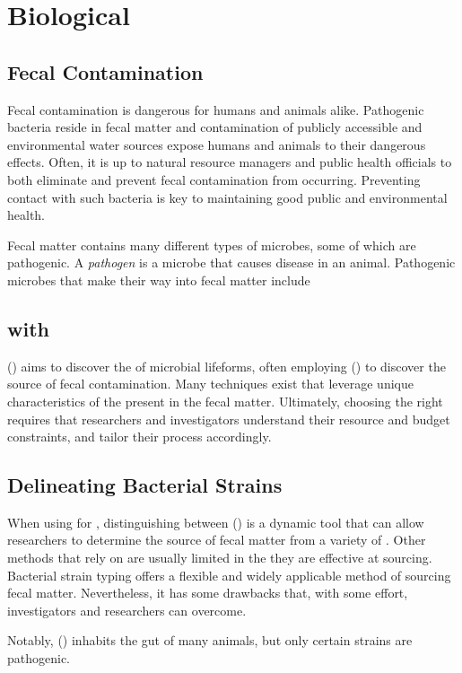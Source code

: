 \section{Biological}
\subsection{Fecal Contamination}
Fecal contamination is dangerous for humans and animals alike.
Pathogenic bacteria reside in fecal matter and contamination of publicly accessible and environmental water sources expose humans and animals to their dangerous effects.
Often, it is up to natural resource managers and public health officials to both eliminate and prevent fecal contamination from occurring.
Preventing contact with such bacteria is key to maintaining good public and environmental health.

Fecal matter contains many different types of microbes, some of which are pathogenic.
A \textit{pathogen} is a microbe that causes disease in an animal.
Pathogenic microbes that make their way into fecal matter include



\subsection{\MSTlong{} with \FIBlong{}}
\MSTlong{} (\mst{}) aims to discover the \spec{} of microbial lifeforms, often employing \FIBlong{} (\fib{}) to discover the source of fecal contamination.
Many techniques exist that leverage unique characteristics of the \fib{} present in the fecal matter.
Ultimately, choosing the right \fib{} requires that researchers and investigators understand their resource and budget constraints, and tailor their \mst{} process accordingly.

\subsection{Delineating Bacterial Strains}
When using \fib{} for \mst{}, distinguishing between \bslongs{} (\bs{}) is a dynamic tool that can allow researchers to determine the source of fecal matter from a variety of \spec{}.
Other methods that rely on \mst{} are usually limited in the \spec{} they are effective at sourcing.
Bacterial strain typing offers a flexible and widely applicable method of sourcing fecal matter.
Nevertheless, it has some drawbacks that, with some effort, \mst{} investigators and researchers can overcome.

Notably, \ecolilong{} (\ecoli{}) inhabits the gut of many animals, but only certain strains are pathogenic.